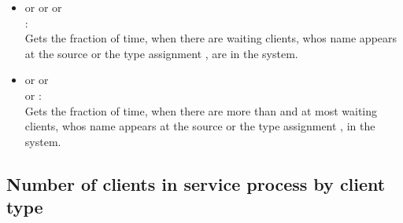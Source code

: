 \begin{itemize}
\item
{} or  or  or\\ :\\
Gets the fraction of time, when there are  waiting clients, whos name appears at the source or the type assignment , are in the system.

\item
{} or  or\\  or :\\
Gets the fraction of time, when there are more than  and at most  waiting clients, whos name appears at the source or the type assignment , in the system.

\end{itemize}



\subsection{Number of clients in service process by client type}

